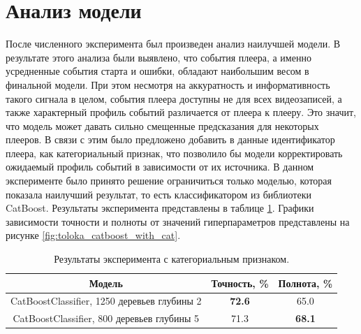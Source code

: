 \section{Анализ модели}

После численного эксперимента был произведен анализ наилучшей модели. В результате этого анализа были выявлено, что события плеера, а именно усредненные события старта и ошибки, обладают наибольшим весом в финальной модели. При этом несмотря на аккуратность и информативность такого сигнала в целом, события плеера доступны не для всех видеозаписей, а также характерный профиль событий различается от плеера к плееру. Это значит, что модель может давать сильно смещенные предсказания для некоторых плееров. В связи с этим было предложено добавить в данные идентификатор плеера, как категориальный признак, что позволило бы модели корректировать ожидаемый профиль событий в зависимости от их источника. В данном эксперименте было принято решение ограничиться только моделью, которая показала наилучший результат, то есть классификатором из библиотеки CatBoost. Результаты эксперимента представлены в таблице \ref{tab:toloka_catboost_with_cat}. Графики зависимости точности и полноты от значений гиперпараметров представлены на рисунке \ref{fig:toloka_catboost_with_cat}.

\begin{table}[h]
    \centering
    \begin{tabular}{|c|c|c|}
        \hline
        Модель & Точность, \% & Полнота, \% \\
        \hline
        CatBoostClassifier, 1250 деревьев глубины 2 & \textbf{72.6} & 65.0 \\
        \hline
        CatBoostClassifier, 800 деревьев глубины 5 & 71.3 & \textbf{68.1} \\
        \hline
    \end{tabular}
    \caption{Результаты эксперимента с категориальным признаком.}
    \label{tab:toloka_catboost_with_cat}
\end{table}

